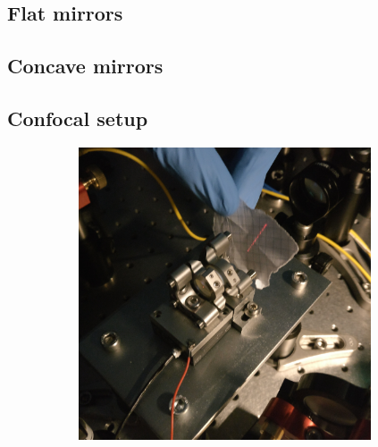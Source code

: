 \subsection{Flat mirrors}


\subsection{Concave mirrors}

\subsection{Confocal setup}


\begin{figure}[H]
	\centering
	\begin{subfigure}[b]{0.48\textwidth}
		\centering
		\includegraphics[width=0.95\textwidth]{figures/fabry-perot/setup/confocal-setup-higher-modes-1}
		\caption{}
		\label{fig:confocal-setup-higher-modes-1}
	\end{subfigure}%
	~ %
	\begin{subfigure}[b]{0.48\textwidth}
		\centering

\end{subfigure}
\end{figure}
